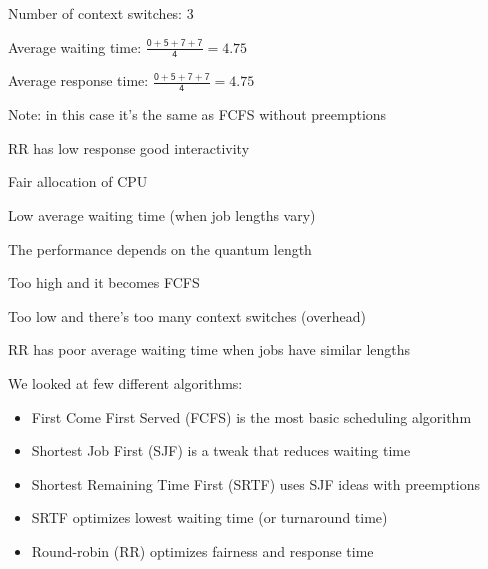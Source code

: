   \begin{slide}


    Number of context switches: 3
    \medskip

    Average waiting time: $\mathsf{\frac{0 + 5 + 7 + 7}{4} = 4.75}$
    \medskip

    Average response time: $\mathsf{\frac{0 + 5 + 7 + 7}{4} = 4.75}$
    \bigskip

    Note: in this case it's the same as FCFS without preemptions

  \end{slide}

  \begin{slide}


    RR has low response good interactivity

    \leftspace{}Fair allocation of CPU

    \leftspace{}Low average waiting time (when job lengths vary)
    \bigskip

    The performance depends on the quantum length

    \leftspace{}Too high and it becomes FCFS

    \leftspace{}Too low and there's too many context switches (overhead)
    \medskip

    RR has poor average waiting time when jobs have similar lengths

  \end{slide}

  \begin{slide}


    We looked at few different algorithms:

    \begin{itemize}
      \item First Come First Served (FCFS) is the most basic scheduling algorithm
      \item Shortest Job First (SJF) is a tweak that reduces waiting time
      \item Shortest Remaining Time First (SRTF) uses SJF ideas with preemptions
      \item SRTF optimizes lowest waiting time (or turnaround time)
      \item Round-robin (RR) optimizes fairness and response time
    \end{itemize}

  \end{slide}

